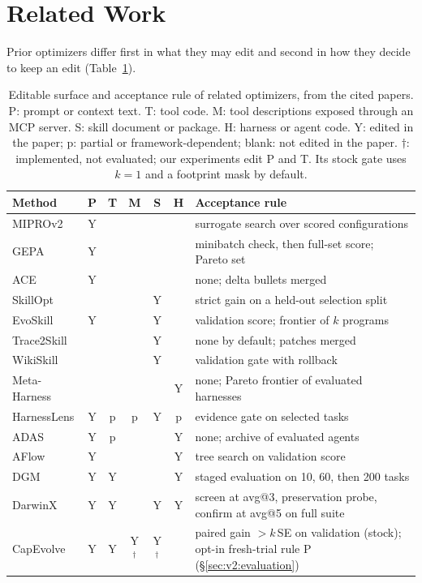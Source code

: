 \section{Related Work}
\label{sec:related}

Prior optimizers differ first in what they may edit and second in how they decide to keep an edit (Table~\ref{tab:surfaces}).

\begin{table}[t]
\centering\footnotesize
\setlength{\tabcolsep}{3pt}
\caption{Editable surface and acceptance rule of related optimizers, from the cited papers. P: prompt or context text. T: tool code. M: tool descriptions exposed through an MCP server. S: skill document or package. H: harness or agent code. Y: edited in the paper; p: partial or framework-dependent; blank: not edited in the paper. $\dagger$: implemented, not evaluated; our experiments edit P and T. Its stock gate uses $k=1$ and a footprint mask by default.}
\label{tab:surfaces}
\begin{tabular}{@{}lcccccl@{}}
\toprule
Method & P & T & M & S & H & Acceptance rule \\
\midrule
MIPROv2 \citep{miprov2-dspy} & Y & & & & & surrogate search over scored configurations \\
GEPA \citep{gepa} & Y & & & & & minibatch check, then full-set score; Pareto set \\
ACE \citep{ace} & Y & & & & & none; delta bullets merged \\
SkillOpt \citep{skillopt} & & & & Y & & strict gain on a held-out selection split \\
EvoSkill \citep{evoskill} & Y & & & Y & & validation score; frontier of $k$ programs \\
Trace2Skill \citep{trace2skill} & & & & Y & & none by default; patches merged \\
WikiSkill \citep{wikiskill} & & & & Y & & validation gate with rollback \\
Meta-Harness \citep{meta-harness} & & & & & Y & none; Pareto frontier of evaluated harnesses \\
HarnessLens \citep{xu2026harnesslens} & Y & p & p & Y & p & evidence gate on selected tasks \\
ADAS \citep{adas} & Y & p & & & Y & none; archive of evaluated agents \\
AFlow \citep{aflow} & Y & & & & Y & tree search on validation score \\
DGM \citep{dgm} & Y & Y & & & Y & staged evaluation on 10, 60, then 200 tasks \\
DarwinX \citep{darwinx} & Y & Y & & Y & Y & screen at avg@3, preservation probe, confirm at avg@5 on full suite \\
\midrule
CapEvolve & Y & Y & Y$^\dagger$ & Y$^\dagger$ & & paired gain $>k\,$SE on validation (stock); opt-in fresh-trial rule P (\S\ref{sec:v2:evaluation}) \\
\bottomrule
\end{tabular}
\end{table}

